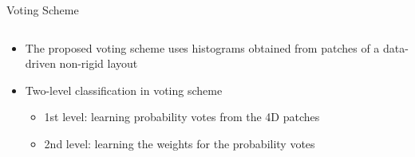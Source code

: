 \documentclass[final,hyperref={pdfpagelabels=false}]{beamer}
\begin{document}
\begin{frame}[t]
\begin{columns}[t]
\begin{column}{.465\textwidth}
\begin{block}{Voting Scheme}


\begin{columns} %
\begin{column}{.54\textwidth} %
\begin{itemize}
\item The proposed voting scheme uses histograms obtained from patches of a data-driven non-rigid layout
\item Two-level classification in voting scheme
\begin{itemize}
\item 1st level: learning probability votes from the 4D patches
\item 2nd level: learning the weights for the probability votes
\end{itemize}
\end{itemize}
\end{column}


\end{columns}
\end{block}
\end{column}
\end{columns}
\end{frame}
\end{document}
